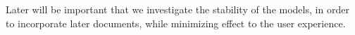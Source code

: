 \documentclass{article}
\begin{document}
\begin{multicols}{2}


Later will be important that we investigate the stability of the models\cite{Yang2016}, in order
to incorporate later documents, while minimizing effect to the user experience.


{}

\end{multicols}
\end{document}
